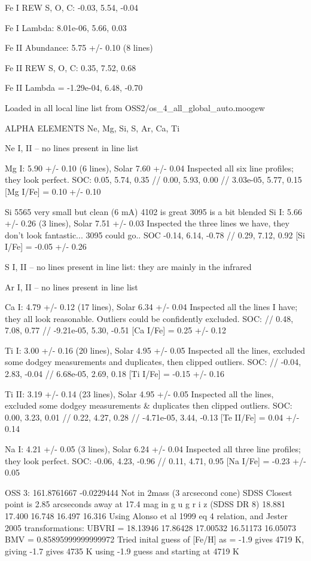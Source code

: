 \documentclass{emulateapj}
\begin{document}
Fe I REW S, O, C: -0.03, 5.54, -0.04

Fe I Lambda: 8.01e-06, 5.66, 0.03

Fe II Abundance: 5.75 +/- 0.10 (8 lines)

Fe II REW S, O, C: 0.35, 7.52, 0.68

Fe II Lambda = -1.29e-04, 6.48, -0.70

Loaded in all local line list from OSS2/os_4_all_global_auto.moogew

ALPHA ELEMENTS
Ne, Mg, Si, S, Ar, Ca, Ti


Ne I, II -- no lines present in line list

Mg I: 5.90 +/- 0.10 (6 lines), Solar 7.60 +/- 0.04
Inspected all six line profiles; they look perfect.
SOC: 0.05, 5.74, 0.35 // 0.00, 5.93, 0.00 // 3.03e-05, 5.77, 0.15
[Mg I/Fe] = 0.10 +/- 0.10

Si
5565 very small but clean (6 mA)
4102 is great
3095 is a bit blended
Si I: 5.66 +/- 0.26 (3 lines), Solar 7.51 +/- 0.03
Inspected the three lines we have, they don't look fantastic...  3095 could go..
SOC -0.14, 6.14, -0.78 // 0.29, 7.12, 0.92
[Si I/Fe] = -0.05 +/- 0.26

S I, II -- no lines present in line list: they are mainly in the infrared

Ar I, II -- no lines present in line list

Ca I: 4.79 +/- 0.12 (17 lines), Solar 6.34 +/- 0.04
Inspected all the lines I have; they all look reasonable. Outliers could be confidently excluded.
SOC: // 0.48, 7.08, 0.77 // -9.21e-05, 5.30, -0.51
[Ca I/Fe] = 0.25 +/- 0.12

Ti I: 3.00 +/- 0.16 (20 lines), Solar 4.95 +/- 0.05
Inspected all the lines, excluded some dodgey measurements and duplicates, then clipped outliers.
SOC: // -0.04, 2.83, -0.04 // 6.68e-05, 2.69, 0.18
[Ti I/Fe] = -0.15 +/- 0.16

Ti II: 3.19 +/- 0.14 (23 lines), Solar 4.95 +/- 0.05
Inspected all the lines, excluded some dodgey measurements & duplicates then clipped outliers.
SOC: 0.00, 3.23, 0.01 // 0.22, 4.27, 0.28 // -4.71e-05, 3.44, -0.13
[Te II/Fe] = 0.04 +/- 0.14

Na I: 4.21 +/- 0.05 (3 lines), Solar 6.24 +/- 0.04
Inspected all three line profiles; they look perfect.
SOC: -0.06, 4.23, -0.96 // 0.11, 4.71, 0.95
[Na I/Fe] = -0.23 +/- 0.05



OSS 3: 161.8761667 -0.0229444
Not in 2mass (3 arcsecond cone)
SDSS  Closest point is 2.85 arcseconds away at 17.4 mag in g
u g r i z (SDSS DR 8)
18.881 17.400 16.748 16.497 16.316
Using Alonso et al 1999 eq 4 relation, and Jester 2005 transformations:
UBVRI = 18.13946 17.86428 17.00532 16.51173 16.05073
BMV = 0.85895999999999972
Tried inital guess of [Fe/H] as = -1.9 gives 4719 K, giving -1.7 gives 4735 K
using -1.9 guess and starting at 4719 K
\end{document}
